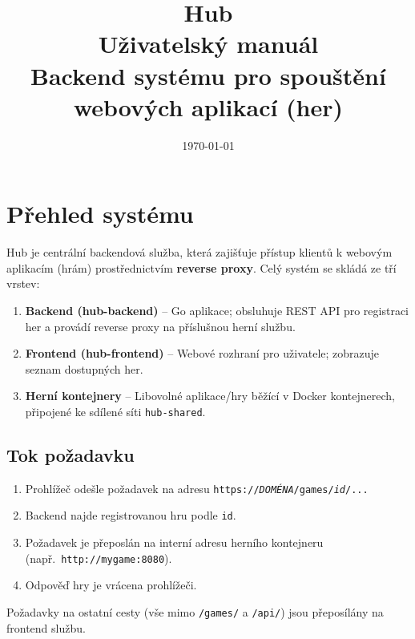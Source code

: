 \documentclass[12pt,a4paper]{article}
\title{
  \Huge\bfseries Hub\\[6pt]
  \large Uživatelský manuál\\[4pt]
  \normalsize Backend systému pro spouštění webových aplikací (her)
}
\author{}
\date{\today}
\begin{document}
\maketitle
\thispagestyle{empty}
\vspace{1cm}

\clearpage

\tableofcontents
\clearpage

\clearpage
\section{Přehled systému}

Hub je centrální backendová služba, která zajišťuje přístup klientů k webovým aplikacím (hrám) prostřednictvím \textbf{reverse proxy}. Celý systém se skládá ze tří vrstev:

\begin{enumerate}[label=\arabic*.]
  \item \textbf{Backend (hub-backend)} -- Go aplikace; obsluhuje REST API pro registraci her a provádí reverse proxy na příslušnou herní službu.
  \item \textbf{Frontend (hub-frontend)} -- Webové rozhraní pro uživatele; zobrazuje seznam dostupných her.
  \item \textbf{Herní kontejnery} -- Libovolné aplikace/hry běžící v Docker kontejnerech, připojené ke sdílené síti \texttt{hub-shared}.
\end{enumerate}

\subsection{Tok požadavku}

\begin{enumerate}[label=\arabic*.]
  \item Prohlížeč odešle požadavek na adresu \texttt{https://\textit{DOMÉNA}/games/\textit{id}/...}
  \item Backend najde registrovanou hru podle \texttt{id}.
  \item Požadavek je přeposlán na interní adresu herního kontejneru (např.\ \texttt{http://mygame:8080}).
  \item Odpověď hry je vrácena prohlížeči.
\end{enumerate}

Požadavky na ostatní cesty (vše mimo \texttt{/games/} a \texttt{/api/}) jsou přeposílány na frontend službu.
\end{document}
